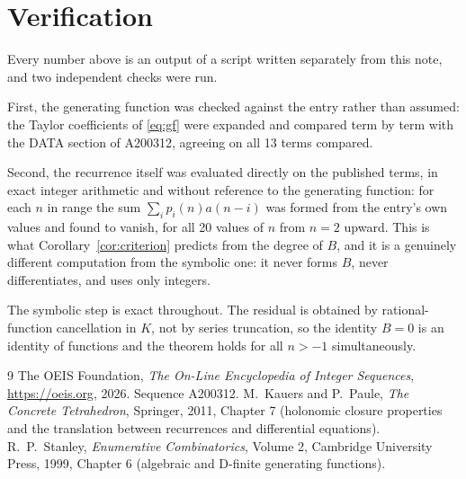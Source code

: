 \documentclass[11pt,a4paper]{article}
\theoremstyle{plain}
\theoremstyle{definition}
\begin{document}
\section{Verification}

Every number above is an output of a script written separately from this note, and two
independent checks were run.

First, the generating function was checked against the entry rather than assumed: the
Taylor coefficients of \eqref{eq:gf} were expanded and compared term by term with the DATA
section of A200312, agreeing on all 13 terms compared.

Second, the recurrence itself was evaluated directly on the published terms, in exact
integer arithmetic and without reference to the generating function: for each $n$ in range
the sum $\sum_{i}p_{i}(n)a(n-i)$ was formed from the entry's own values and found to
vanish, for all 20 values of $n$ from $n=2$ upward. This is what
Corollary~\ref{cor:criterion} predicts from the degree of $B$, and it is a genuinely
different computation from the symbolic one: it never forms $B$, never differentiates, and
uses only integers.

The symbolic step is exact throughout. The residual is obtained by rational-function
cancellation in $K$, not by series truncation, so the identity $B=0$ is an
identity of functions and the theorem holds for all $n>-1$ simultaneously.

\begin{thebibliography}{9}
 The OEIS Foundation, \emph{The On-Line Encyclopedia of Integer Sequences},
\url{https://oeis.org}, 2026. Sequence A200312.
 M.~Kauers and P.~Paule, \emph{The Concrete Tetrahedron}, Springer, 2011,
Chapter 7 (holonomic closure properties and the translation between recurrences and
differential equations).
 R.~P.~Stanley, \emph{Enumerative Combinatorics}, Volume 2, Cambridge
University Press, 1999, Chapter 6 (algebraic and D-finite generating functions).
\end{thebibliography}
\end{document}
